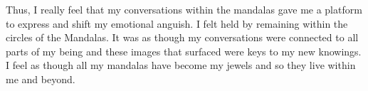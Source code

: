 Thus, I really feel that my conversations within the mandalas gave me a platform to express and shift my emotional anguish. I felt held by remaining within the circles of the Mandalas. It was as though my conversations were connected to all parts of my being and these images that surfaced were keys to my new knowings. I feel as though all my mandalas have become my jewels and so they live within me and beyond. 






















